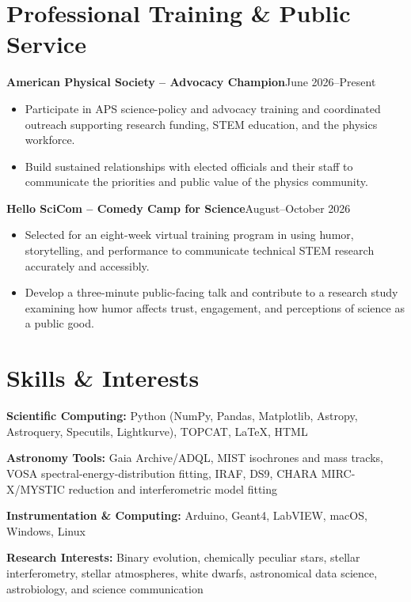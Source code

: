 \documentclass[10pt,a4paper]{article}
\newcommand{\entry}[2]{%
  \par\vspace{2pt}%
  \noindent\textbf{#1}\hfill#2\par
}
\newenvironment{items}
  {\begin{itemize}[leftmargin=1.2em,itemsep=0.6pt,topsep=1.5pt,parsep=0pt,
                   label=\textbullet]}
  {\end{itemize}}
\newcommand{\skill}[2]{\begingroup\sloppy\noindent\textbf{#1} #2\par\endgroup\vspace{1.5pt}}
\begin{document}
\section{Professional Training \& Public Service}

\entry{American Physical Society -- Advocacy Champion}{June 2026--Present}
\begin{items}
  \item Participate in APS science-policy and advocacy training and coordinated outreach
        supporting research funding, STEM education, and the physics workforce.
  \item Build sustained relationships with elected officials and their staff to communicate
        the priorities and public value of the physics community.
\end{items}

\entry{Hello SciCom -- Comedy Camp for Science}{August--October 2026}
\begin{items}
  \item Selected for an eight-week virtual training program in using humor, storytelling,
        and performance to communicate technical STEM research accurately and accessibly.
  \item Develop a three-minute public-facing talk and contribute to a research study
        examining how humor affects trust, engagement, and perceptions of science as a
        public good.
\end{items}

\section{Skills \& Interests}

\skill{Scientific Computing:}{Python (NumPy, Pandas, Matplotlib, Astropy, Astroquery,
Specutils, Lightkurve), TOPCAT, \LaTeX{}, HTML}

\skill{Astronomy Tools:}{Gaia Archive/ADQL, MIST isochrones and mass tracks, VOSA
spectral-energy-distribution fitting, IRAF, DS9, CHARA MIRC-X/MYSTIC reduction and
interferometric model fitting}

\skill{Instrumentation \& Computing:}{Arduino, Geant4, LabVIEW, macOS, Windows, Linux}

\skill{Research Interests:}{Binary evolution, chemically peculiar stars, stellar
interferometry, stellar atmospheres, white dwarfs, astronomical data science, astrobiology,
and science communication}
\end{document}
